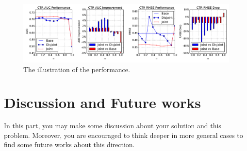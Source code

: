 \documentclass{article}
\begin{document}
\begin{figure}[t]
  \centering
  \includegraphics[width=1.0\columnwidth]{figures/basic-perf4.pdf}
  \caption{The illustration of the performance.}\label{fig:basic}
\end{figure}

\section{Discussion and Future works}\label{sec:discuss}
In this part, you may make some discussion about your solution and this problem.
Moreover, you are encouraged to think deeper in more general cases to find some future works about this direction.



\end{document}
